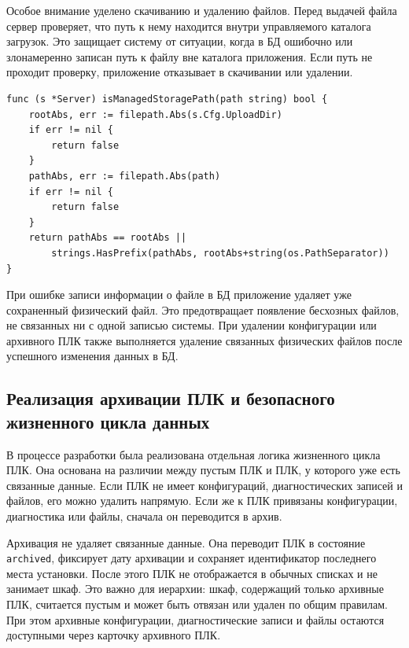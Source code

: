Особое внимание уделено скачиванию и удалению файлов. Перед выдачей файла сервер проверяет, что путь к нему находится внутри управляемого каталога загрузок. Это защищает систему от ситуации, когда в БД ошибочно или злонамеренно записан путь к файлу вне каталога приложения. Если путь не проходит проверку, приложение отказывает в скачивании или удалении.

\begin{samepage}
\begin{lstlisting}[caption={Проверка принадлежности пути каталогу загрузок}, label={lst:chapter3_storage_path}]
func (s *Server) isManagedStoragePath(path string) bool {
    rootAbs, err := filepath.Abs(s.Cfg.UploadDir)
    if err != nil {
        return false
    }
    pathAbs, err := filepath.Abs(path)
    if err != nil {
        return false
    }
    return pathAbs == rootAbs ||
        strings.HasPrefix(pathAbs, rootAbs+string(os.PathSeparator))
}
\end{lstlisting}
\end{samepage}

При ошибке записи информации о файле в БД приложение удаляет уже сохраненный физический файл. Это предотвращает появление бесхозных файлов, не связанных ни с одной записью системы. При удалении конфигурации или архивного ПЛК также выполняется удаление связанных физических файлов после успешного изменения данных в БД.


\subsection{Реализация архивации ПЛК и безопасного жизненного цикла данных}

В процессе разработки была реализована отдельная логика жизненного цикла ПЛК. Она основана на различии между пустым ПЛК и ПЛК, у которого уже есть связанные данные. Если ПЛК не имеет конфигураций, диагностических записей и файлов, его можно удалить напрямую. Если же к ПЛК привязаны конфигурации, диагностика или файлы, сначала он переводится в архив.

Архивация не удаляет связанные данные. Она переводит ПЛК в состояние \texttt{archived}, фиксирует дату архивации и сохраняет идентификатор последнего места установки. После этого ПЛК не отображается в обычных списках и не занимает шкаф. Это важно для иерархии: шкаф, содержащий только архивные ПЛК, считается пустым и может быть отвязан или удален по общим правилам. При этом архивные конфигурации, диагностические записи и файлы остаются доступными через карточку архивного ПЛК.

